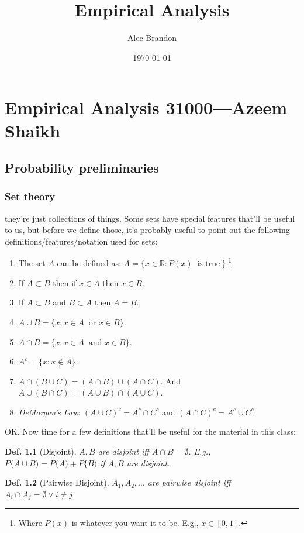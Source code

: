 \documentclass{tufte-book}
\title{Empirical Analysis}
\author{Alec Brandon}
\date{\today}
\theoremstyle{mytheoremstyle}
\theoremstyle{mylemstyle}
\theoremstyle{mydefstyle}
\newtheorem*{mydef}{Def.}
\begin{document}
\maketitle
\part{Empirical Analysis 31000---Azeem Shaikh}
\chapter{Probability preliminaries}
\section{Set theory}
 they're just collections of things. Some sets have special features that'll be useful to us, but before we define those, it's probably useful to point out the following definitions/features/notation used for sets:
	\begin{enumerate}
		\item The set \(A\) can be defined as: \(A = \{x \in \mathbb{R} : P(x)\ \text{ is true}\ \}\).\footnote{Where \(P(x)\) is whatever you want it to be. E.g., \(x \in [0, 1]\).}
		\item If \(A \subset B\) then if \(x \in A\) then \(x \in B\).
		\item If \(A \subset B\) and \(B \subset A\) then \(A = B\).
		\item \(A \cup B = \{x: x \in A\ \text{ or } x \in B\} \).
		\item \(A \cap B = \{x: x \in A\ \text{ and } x \in B\} \).
		\item \(A^c = \{x: x \not \in A\} \).
		\item \(A \cap (B \cup C) = (A \cap B) \cup (A \cap C)\). And \(A \cup (B \cap C) = (A \cup B) \cap (A \cup C)\). 
		\item \emph{DeMorgan's Law}: \((A \cup C)^c = A^c \cap C^c\) and \((A \cap C)^c = A^c \cup C^c\).
	\end{enumerate}
OK. Now time for a few definitions that'll be useful for the material in this class:
	\begin{mydef}[Disjoint]
		\(A, B\) are disjoint iff \(A \cap B = \emptyset\). E.g., \(P\{A \cup B) = P\{A) + P\{B)\) if \(A, B\) are disjoint.
	\end{mydef}
	
	\begin{mydef}[Pairwise Disjoint]
		\(A_1, A_2, \dots\) are pairwise disjoint iff \(A_i \cap A_j = \emptyset\ \forall\ i \ne j\).
	\end{mydef}
	
\end{document}
